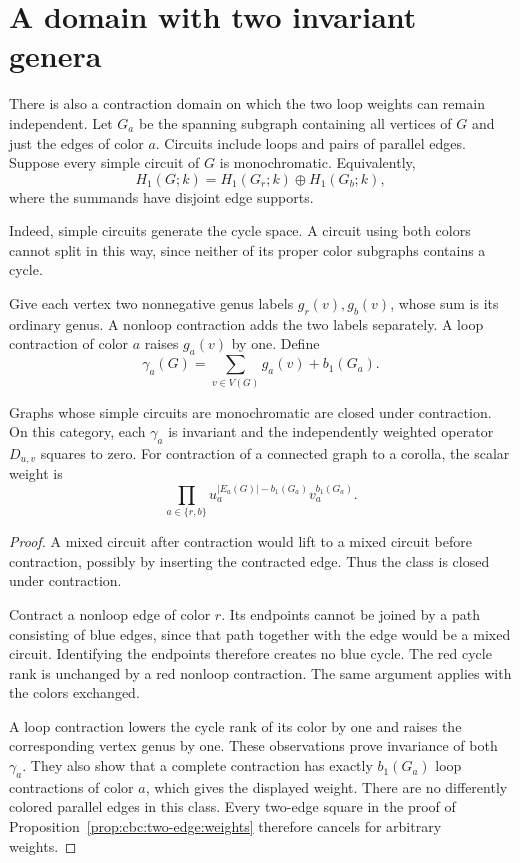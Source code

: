 \section{A domain with two invariant genera}

There is also a contraction domain on which the two loop weights can remain independent.
Let $G_a$ be the spanning subgraph containing all vertices of $G$ and just the edges of color $a$.
Circuits include loops and pairs of parallel edges.
Suppose every simple circuit of $G$ is monochromatic.
Equivalently,
\[
 H_1(G;k)=H_1(G_r;k)\oplus H_1(G_b;k),
\]
where the summands have disjoint edge supports.

Indeed, simple circuits generate the cycle space.
A circuit using both colors cannot split in this way, since neither of its proper color subgraphs contains a cycle.

Give each vertex two nonnegative genus labels $g_r(v),g_b(v)$, whose sum is its ordinary genus.
A nonloop contraction adds the two labels separately.
A loop contraction of color $a$ raises $g_a(v)$ by one.
Define
\[
 \gamma_a(G)=\sum_{v\in V(G)}g_a(v)+b_1(G_a).
\]

\begin{proposition}\label{prop:cbc:two-edge:two-genera}
Graphs whose simple circuits are monochromatic are closed under contraction.
On this category, each $\gamma_a$ is invariant and the independently weighted operator $D_{u,v}$ squares to zero.
For contraction of a connected graph to a corolla, the scalar weight is
\[
 \prod_{a\in\{r,b\}}
 u_a^{|E_a(G)|-b_1(G_a)}v_a^{b_1(G_a)}.
\]
\end{proposition}
\begin{proof}
A mixed circuit after contraction would lift to a mixed circuit before contraction, possibly by inserting the contracted edge.
Thus the class is closed under contraction.

Contract a nonloop edge of color $r$.
Its endpoints cannot be joined by a path consisting of blue edges, since that path together with the edge would be a mixed circuit.
Identifying the endpoints therefore creates no blue cycle.
The red cycle rank is unchanged by a red nonloop contraction.
The same argument applies with the colors exchanged.

A loop contraction lowers the cycle rank of its color by one and raises the corresponding vertex genus by one.
These observations prove invariance of both $\gamma_a$.
They also show that a complete contraction has exactly $b_1(G_a)$ loop contractions of color $a$, which gives the displayed weight.
There are no differently colored parallel edges in this class.
Every two-edge square in the proof of Proposition~\ref{prop:cbc:two-edge:weights} therefore cancels for arbitrary weights.
\end{proof}

